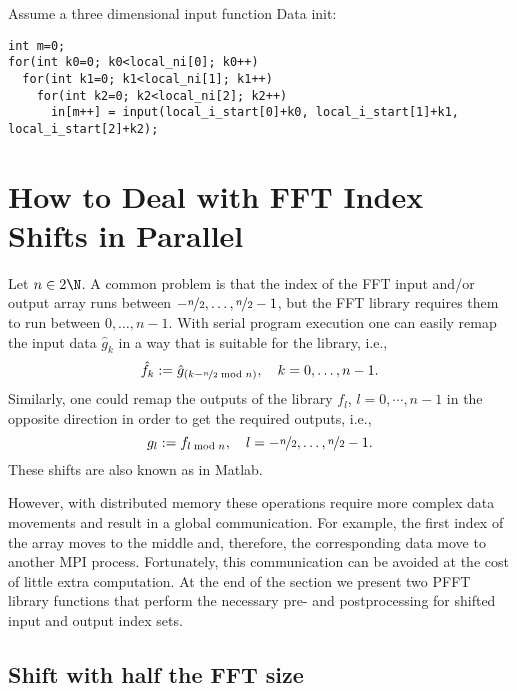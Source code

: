 Assume a three dimensional input function 
Data init:
\begin{lstlisting}
int m=0;
for(int k0=0; k0<local_ni[0]; k0++)
  for(int k1=0; k1<local_ni[1]; k1++)
    for(int k2=0; k2<local_ni[2]; k2++)
      in[m++] = input(local_i_start[0]+k0, local_i_start[1]+k1, local_i_start[2]+k2);
\end{lstlisting}


\section{How to Deal with FFT Index Shifts in Parallel}
Let $n\in2\N$. A common problem is that the index of the FFT input and/or output array runs between $-\nicefrac n2,\hdots,\nicefrac n2-1$,
but the FFT library requires them to run between $0,\hdots,n-1$. With serial program execution one can easily remap the input data $\hat g_k$
in a way that is suitable for the library, i.e.,
\begin{equation*}
  \hat f_k := \hat g_{(k-\nicefrac n2\bmod n)}, \quad k = 0,\hdots,n-1.
\end{equation*}
Similarly, one could remap the outputs of the library $f_l$, $l=0,\cdots,n-1$ in the opposite direction in order to get the
required outputs, i.e.,
\begin{equation*}
  g_l := f_{l \bmod n}, \quad l = -\nicefrac n2,\hdots,\nicefrac n2-1.
\end{equation*}
These shifts are also known as  in Matlab.

However, with distributed memory these  operations require more complex data movements and result in a global communication.
For example, the first index of the array moves to the middle and, therefore, the corresponding data move to another MPI process.
Fortunately, this communication can be avoided at the cost of little extra computation.
At the end of the section we present two PFFT library functions that perform the necessary pre- and postprocessing
for shifted input and output index sets.

\subsection{Shift with half the FFT size}

